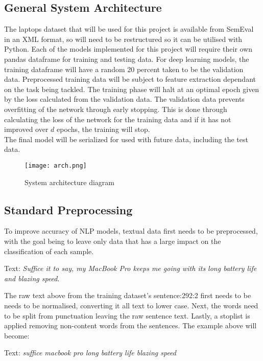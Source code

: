 \documentclass[11pt]{article}
\begin{document}
\subsection{General System Architecture}
The laptops dataset that will be used for this project is available from SemEval in an XML format, so will need to be restructured so it can be utilised with Python. Each of the models implemented for this project will require their own pandas dataframe for training and testing data. For deep learning models, the training dataframe will have a random 20 percent taken to be the validation data. Preprocessed training data will be subject to feature extraction dependant on the task being tackled. The training phase will halt at an optimal epoch given by the loss calculated from the validation data. The validation data prevents overfitting of the network through early stopping. This is done through calculating the loss of the network for the training data and if it has not improved over $d$ epochs, the training will stop. \\
The final model will be serialized for used with future data, including the test data.  
\begin{figure}[t]
    \texttt{[image: arch.png]}
    \caption{System architecture diagram}
    \centering
\end{figure}
\subsection{Standard Preprocessing}\label{preprocessing}
To improve accuracy of NLP models, textual data first needs to be preprocessed, with the goal being to leave only data that has a large impact on the classification of each sample. 
\begin{center}
    Text: \textit{Suffice it to say, my MacBook Pro keeps me going with its long battery life and blazing speed}.\\
\end{center}
The raw text above from the training dataset's sentence:292:2 first needs to be needs to be normalised, converting it all text to lower case. Next, the words need to be split from punctuation leaving the raw sentence text. Lastly, a stoplist is applied removing non-content words from the sentences. The example above will become:  

\begin{center}
    Text: \textit{suffice macbook pro long battery life blazing speed}
\end{center}
\end{document}
